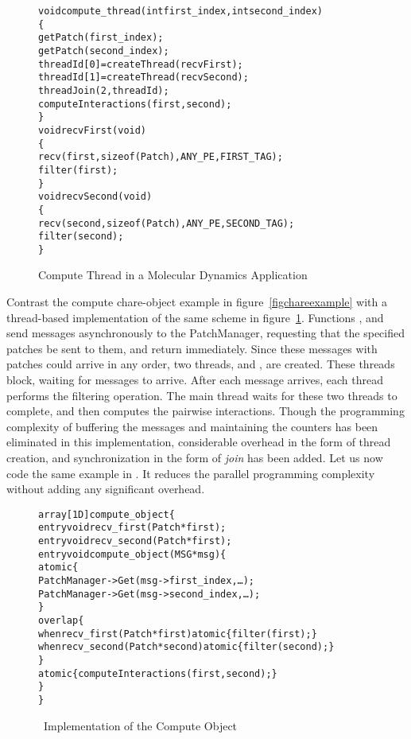 \begin{figure}[ht]
\begin{center}
\begin{alltt}
void compute_thread(int first_index, int second_index)
\{
    getPatch(first_index);
    getPatch(second_index);
    threadId[0] = createThread(recvFirst);
    threadId[1] = createThread(recvSecond);
    threadJoin(2, threadId);
    computeInteractions(first, second);
  \}
  void recvFirst(void)
  \{
    recv(first, sizeof(Patch), ANY_PE, FIRST_TAG);
    filter(first);
  \}
  void recvSecond(void)
  \{
    recv(second, sizeof(Patch), ANY_PE, SECOND_TAG);
    filter(second);
  \}
\end{alltt}
\end{center}
\caption{Compute Thread in a Molecular Dynamics Application}
\label{figthreadexample}
\end{figure}

Contrast the compute chare-object example in figure~\ref{figchareexample} with
a thread-based implementation of the same scheme in
figure~\ref{figthreadexample}. Functions , and  send
messages asynchronously to the PatchManager, requesting that the specified
patches be sent to them, and return immediately. Since these messages with
patches could arrive in any order, two threads,  and
, are created. These threads block, waiting for messages to
arrive. After each message arrives, each thread performs the filtering
operation. The main thread waits for these two threads to complete, and then
computes the pairwise interactions. Though the programming complexity of
buffering the messages and maintaining the counters has been eliminated in this
implementation, considerable overhead in the form of thread creation, and
synchronization in the form of {\em join} has been added. Let us now code the
same example in \sdag. It reduces the parallel programming complexity without
adding any significant overhead.

\begin{figure}[ht]
\begin{center}
\begin{alltt}
  array[1D] compute_object \{
    entry void recv_first(Patch *first);
    entry void recv_second(Patch *first);
    entry void compute_object(MSG *msg)\{
      atomic \{
         PatchManager->Get(msg->first_index,\dots);
         PatchManager->Get(msg->second_index,\dots);
      \}
      overlap \{
        when recv_first(Patch *first) atomic \{ filter(first); \}
        when recv_second(Patch *second) atomic \{ filter(second); \}
      \}
      atomic \{ computeInteractions(first, second); \}
    \}
  \}
\end{alltt}
\end{center}
\caption{\sdag\ Implementation of the Compute Object}
\label{figsdagexample}
\end{figure}

